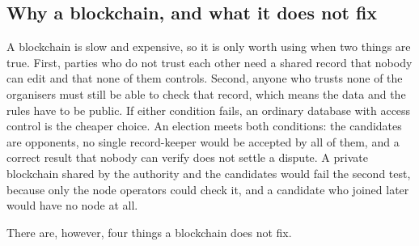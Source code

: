 \subsection{Why a blockchain, and what it does not fix}

A blockchain is slow and expensive, so it is only worth using when two things
are true. First, parties who do not trust each other need a shared record that
nobody can edit and that none of them controls. Second, anyone who trusts none
of the organisers must still be able to check that record, which means the
data and the rules have to be public. If either condition fails, an ordinary
database with access control is the cheaper choice. An election meets both
conditions: the candidates are opponents, no single record-keeper would be
accepted by all of them, and a correct result that nobody can verify does not
settle a dispute. A private blockchain shared by the authority and the
candidates would fail the second test, because only the node operators could
check it, and a candidate who joined later would have no node at all.

There are, however, four things a blockchain does not fix.

